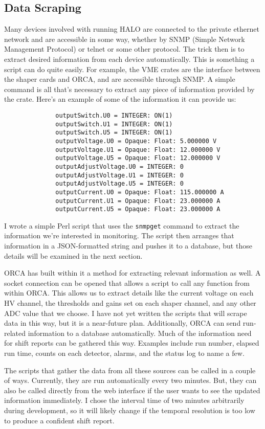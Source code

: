 		\subsection{Data Scraping}
			Many devices involved with running HALO are connected to the private ethernet network and are accessible in some way, whether by SNMP (Simple Network Management Protocol) or telnet or some other protocol. The trick then is to extract desired information from each device automatically. This is something a script can do quite easily. For example, the VME crates are the interface between the shaper cards and ORCA, and are accessible through SNMP. A simple command is all that's necessary to extract any piece of information provided by the crate. Here's an example of some of the information it can provide us:
			\begin{verbatim}
			  outputSwitch.U0 = INTEGER: ON(1)
			  outputSwitch.U1 = INTEGER: ON(1)
			  outputSwitch.U5 = INTEGER: ON(1)
			  outputVoltage.U0 = Opaque: Float: 5.000000 V
			  outputVoltage.U1 = Opaque: Float: 12.000000 V
			  outputVoltage.U5 = Opaque: Float: 12.000000 V
			  outputAdjustVoltage.U0 = INTEGER: 0
			  outputAdjustVoltage.U1 = INTEGER: 0
			  outputAdjustVoltage.U5 = INTEGER: 0
			  outputCurrent.U0 = Opaque: Float: 115.000000 A
			  outputCurrent.U1 = Opaque: Float: 23.000000 A
			  outputCurrent.U5 = Opaque: Float: 23.000000 A
			\end{verbatim}
			I wrote a simple Perl script that uses the \verb$snmpget$ command to extract the information we're interested in monitoring. The script then arranges that information in a JSON-formatted string and pushes it to a database, but those details will be examined in the next section.

			ORCA has built within it a method for extracting relevant information as well. A socket connection can be opened that allows a script to call any function from within ORCA. This allows us to extract details like the current voltage on each HV channel, the thresholds and gains set on each shaper channel, and any other ADC value that we choose. I have not yet written the scripts that will scrape data in this way, but it is a near-future plan. Additionally, ORCA can send run-related information to a database automatically. Much of the information need for shift reports can be gathered this way. Examples include run number, elapsed run time, counts on each detector, alarms, and the status log to name a few.

			The scripts that gather the data from all these sources can be called in a couple of ways. Currently, they are run automatically every two minutes. But, they can also be called directly from the web interface if the user wants to see the updated information immediately. I chose the interval time of two minutes arbitrarily during development, so it will likely change if the temporal resolution is too low to produce a confident shift report.


